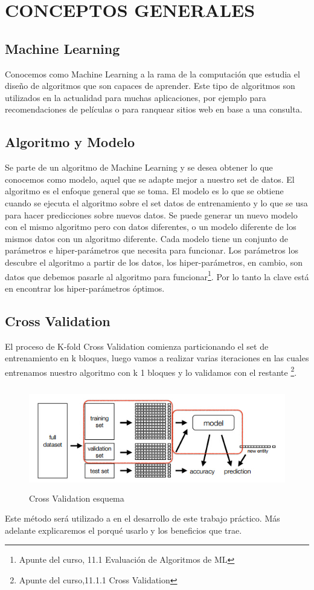 \section{CONCEPTOS GENERALES}

\subsection{Machine Learning}
Conocemos como Machine Learning a la rama de la computación que estudia el diseño de algoritmos que son capaces de aprender. Este tipo de algoritmos son utilizados en la actualidad para muchas aplicaciones, por ejemplo para recomendaciones de películas o para ranquear sitios web en base a una consulta.


\subsection{Algoritmo y Modelo}

Se parte de un algoritmo de Machine Learning y se desea obtener lo que conocemos como modelo, aquel que se adapte mejor a nuestro set de datos. El algoritmo es el enfoque general que se toma. El modelo es lo que se obtiene cuando se ejecuta el algoritmo sobre el set datos de entrenamiento y lo que se usa para hacer predicciones sobre nuevos datos. Se puede generar un nuevo modelo con el mismo algoritmo pero con datos diferentes, o un modelo diferente de los mismos datos con un algoritmo diferente. 
Cada modelo tiene un conjunto de parámetros e hiper-parámetros que necesita para funcionar. Los parámetros los descubre el algoritmo a partir de los datos, los hiper-parámetros, en cambio, son datos que debemos pasarle al algoritmo para funcionar\footnote{Apunte del curso, 11.1
Evaluación de Algoritmos de ML}. Por lo tanto la clave está en encontrar los hiper-parámetros óptimos.

\subsection{Cross Validation}

El proceso de K-fold Cross Validation comienza particionando el set de entrenamiento en k bloques, luego vamos a realizar varias iteraciones en las cuales entrenamos nuestro algoritmo con k 1 bloques y lo validamos con el restante \footnote{Apunte del curso,11.1.1
Cross Validation}.

\begin{figure}[h]
\centering
\includegraphics[height=4.5cm]{imagenes/crossValidation}
\caption{Cross Validation esquema}
\label{fig:exemplo}
\end{figure}

Este método será utilizado a en el desarrollo de este trabajo práctico. Más adelante explicaremos el porqué usarlo y los beneficios que trae.

